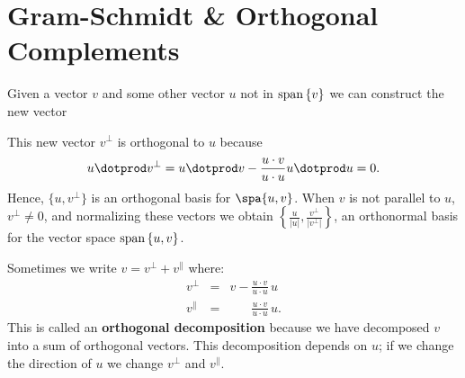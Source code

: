 
%



\section{Gram-Schmidt \& Orthogonal Complements}\label{gramschmidt}


Given a vector $v$ and some other vector $u$ not in  $ {\rm span}\, \{v\} $ we can construct the new vector 
\begin{center}
\hypertarget{projectionpic}{}
\end{center}
This new vector $v^\perp$ is orthogonal to $u$ because 
\[
u\dotprod v^\perp = u\dotprod v - \frac{u\cdot v}{u\cdot u}u\dotprod u = 0.
\]
Hence, $\{u, v^\perp\}$ is an orthogonal basis for $\spa \{u,v\}$.  When $v$ is not parallel to $u$, $v^\perp \neq 0$, and normalizing these vectors we obtain $\left\{\frac{u}{|u|}, \frac{v^\perp}{|v^\perp|} \right\}$, an orthonormal basis for the vector space ${\rm span}\, \{u,v\}$.

Sometimes we write $v = v^\perp + v^\parallel$ where:
\begin{eqnarray*}
v^\perp &=& v-\frac{u\cdot v}{u\cdot u}\, u \\[1mm]
v^\parallel &=& \phantom{v-}\frac{u\cdot v}{u\cdot u}\, u.
\end{eqnarray*}
This is called an {\bf orthogonal decomposition} because we have decomposed $v$ into a sum of orthogonal vectors.  This decomposition depends on $u$; if we change the direction of $u$ we change $v^\perp$ and $v^\parallel$.

